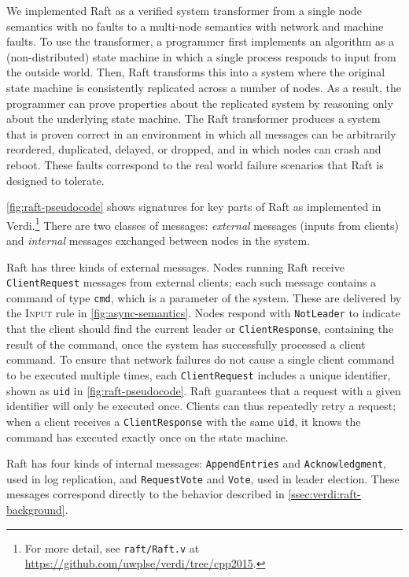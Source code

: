 We implemented Raft as a verified system transformer
from a single node semantics with no faults
to a multi-node semantics with network and machine faults.
To use the transformer,
a programmer first implements an algorithm as a (non-distributed) state machine
in which a single process responds to input from the outside world.
Then, Raft transforms this into a system where the original state machine
is consistently replicated across a number of nodes.
As a result, the programmer can prove properties about the replicated system
by reasoning only about the underlying state machine.
The Raft transformer produces a system that is proven correct in
an environment in which
all messages can be arbitrarily reordered, duplicated, delayed, or dropped,
and in which nodes can crash and reboot.
These faults correspond to the real world failure scenarios
that Raft is designed to tolerate.

\cref{fig:raft-pseudocode} shows signatures for key parts of
Raft as implemented in Verdi.\footnote{For
    more detail, see \texttt{raft/Raft.v} at
    \url{https://github.com/uwplse/verdi/tree/cpp2015}.}
There are two classes of messages:
\textit{external} messages (inputs from clients) and
\textit{internal} messages exchanged between nodes in the system.

Raft has three kinds of external messages.
Nodes running Raft receive \texttt{ClientRequest} messages from external clients;
each such message contains a command of type \texttt{cmd},
which is a parameter of the system. These are delivered by the
\textsc{Input} rule in \cref{fig:async-semantics}.
Nodes respond with \texttt{NotLeader}
to indicate that the client should find the current leader
or \texttt{ClientResponse}, containing the result of the command,
once the system has successfully processed a client command.
To ensure that network failures do not cause
a single client command to be executed multiple times,
each \texttt{ClientRequest} includes a unique identifier,
shown as \texttt{uid} in \cref{fig:raft-pseudocode}.
Raft guarantees that a request with a given identifier
will only be executed once.
Clients can thus repeatedly retry a request;
when a client receives a \texttt{ClientResponse}
with the same \texttt{uid},
it knows the command has executed exactly once on the state machine.

Raft has four kinds of internal messages:
\texttt{AppendEntries} and \texttt{Acknowledgment},
used in log replication,
and \texttt{RequestVote} and \texttt{Vote},
used in leader election.
These messages correspond directly to the behavior described
in \cref{ssec:verdi:raft-background}.

